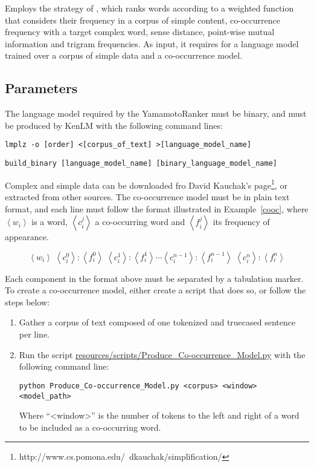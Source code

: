 Employs the strategy of \cite{Yamamoto2013}, which ranks words according to a weighted function that considers their frequency in a corpus of simple content, co-occurrence frequency with a target complex word, sense distance, point-wise mutual information and trigram frequencies. As input, it requires for a language model trained over a corpus of simple data and a co-occurrence model.

\subsection{Parameters}

The language model required by the YamamotoRanker must be binary, and must be produced by KenLM with the following command lines:

\begin{lstlisting}
lmplz -o [order] <[corpus_of_text] >[language_model_name]
\end{lstlisting}
\begin{lstlisting}
build_binary [language_model_name] [binary_language_model_name]
\end{lstlisting}

Complex and simple data can be downloaded fro David Kauchak's page\footnote{http://www.cs.pomona.edu/~dkauchak/simplification/}, or extracted from other sources. The co-occurrence model must be in plain text format, and each line must follow the format illustrated in Example~\ref{cooc}, where $\left\langle w_{i} \right\rangle$ is a word, $\left\langle c_{i}^{j} \right\rangle$ a co-occurring word and $\left\langle f_{i}^{j} \right\rangle$ its frequency of appearance.

\begin{equation}
\label{cooc}
\left\langle w_{i} \right\rangle\; \left\langle c_{i}^{0} \right\rangle\!:\!\left\langle f_{i}^{0} \right\rangle\;\left\langle c_{i}^{1} \right\rangle\!:\!\left\langle f_{i}^{1} \right\rangle\cdots\left\langle c_{i}^{n-1} \right\rangle\!:\!\left\langle f_{i}^{n-1} \right\rangle \; \left\langle c_{i}^{n} \right\rangle\!:\!\left\langle f_{i}^{n} \right\rangle
\end{equation}

Each component in the format above must be separated by a tabulation marker. To create a co-occurrence model, either create a script that does so, or follow the steps below:

\begin{enumerate}
\item Gather a corpus of text composed of one tokenized and truecased sentence per line.
\item Run the script \url{resources/scripts/Produce_Co-occurrence_Model.py} with the following command line:

\begin{lstlisting}
python Produce_Co-occurrence_Model.py <corpus> <window> <model_path>
\end{lstlisting}

Where ``<window>'' is the number of tokens to the left and right of a word to be included as a co-occurring word.

\end{enumerate}

